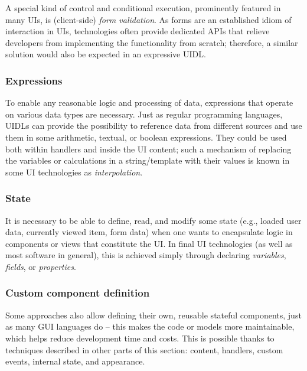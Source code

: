 A special kind of control and conditional execution, prominently featured in many UIs, is (client-side) \emph{form validation}.
As forms are an established idiom of interaction in UIs, technologies often provide dedicated APIs that relieve developers from implementing the functionality from scratch;
therefore, a similar solution would also be expected in an expressive UIDL\@.

\subsubsection{Expressions}
To enable any reasonable logic and processing of data, expressions that operate on various data types are necessary.
Just as regular programming languages, UIDLs can provide the possibility to reference data from different sources and use them in some arithmetic, textual, or boolean expressions.
They could be used both within handlers and inside the UI content;
such a mechanism of replacing the variables or calculations in a string/template with their values is known in some UI technologies as \emph{interpolation}.

\subsubsection{State}
It is necessary to be able to define, read, and modify some state (e.g., loaded user data, currently viewed item, form data) when one wants to encapsulate logic in components or views that constitute the UI\@.
In final UI technologies (as well as most software in general), this is achieved simply through declaring \emph{variables}, \emph{fields}, or \emph{properties}.

\subsubsection{Custom component definition}
Some approaches also allow defining their own, reusable stateful components, just as many GUI languages do -- this makes the code or models more maintainable, which helps reduce development time and costs.
This is possible thanks to techniques described in other parts of this section: content, handlers, custom events, internal state, and appearance.

